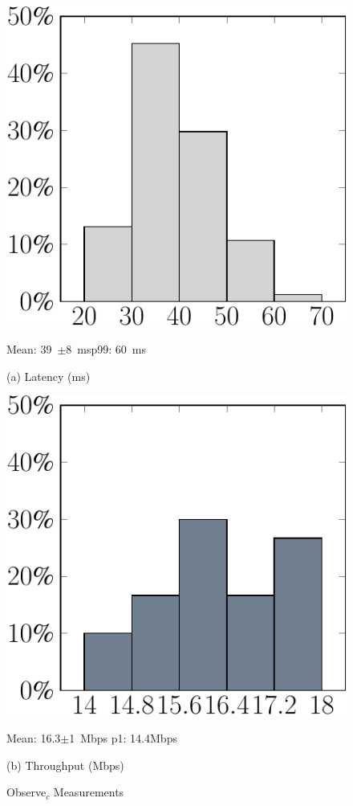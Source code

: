 \begin{figure}
\vspace{0.1in}
\centering
\begin{minipage}[b]{.49\linewidth}
\centering
\includegraphics[width=0.8\linewidth]{chapter5/FIGS/histo-observec-latency.pdf}\\
\begin{captext}
\centering
Mean: 39~$\pm$8~ms\;p99: 60~ms \\
\end{captext}
{\small (a) Latency (ms)}
\end{minipage}
\begin{minipage}[b]{0.49\linewidth}
\centering
\includegraphics[width=0.8\linewidth]{chapter5/FIGS/histo-observec-throughput.pdf}\\
\begin{captext}
\centering
Mean: 16.3$\pm$1~Mbps p1: 14.4Mbps \\
\end{captext}
{\small (b) Throughput (Mbps)}
\end{minipage}
\caption{Observe$_c$ Measurements}
\label{fig:d2c-net}
\end{figure}

